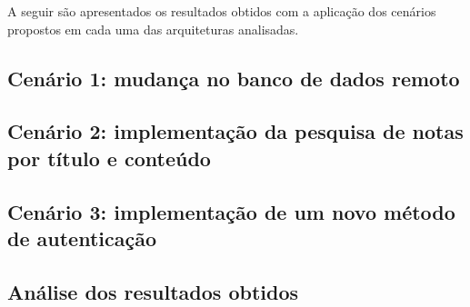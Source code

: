 A seguir são apresentados os resultados obtidos com a aplicação dos cenários propostos em cada uma das arquiteturas analisadas.

\subsection{Cenário 1: mudança no banco de dados remoto}



\subsection{Cenário 2: implementação da pesquisa de notas por título e conteúdo}



\subsection{Cenário 3: implementação de um novo método de autenticação}



\subsection{Análise dos resultados obtidos}

